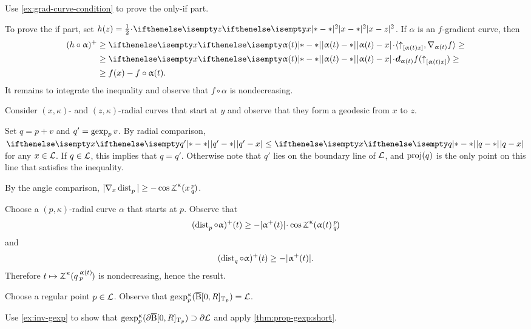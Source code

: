 Use \ref{ex:grad-curve-condition} to prove the only-if part.

To prove the if part, set $h(z)=\tfrac12\cdot\dist[2]{x}{z}{}$.
If $\alpha$ is an $f$-gradient curve, then 
\begin{align*}
(h\circ\alpha)^+&\ge \dist{\alpha(t)}{x}{}\cdot\langle\dir{\alpha(t)}{x},\nabla_{\alpha(t)}f\rangle\ge
\\
&\ge \dist{\alpha(t)}{x}{}\cdot\dd_{\alpha(t)}f(\dir{\alpha(t)}{x})\ge 
\\
&\ge f(x)-f\circ\alpha(t).
\end{align*}
It remains to integrate the inequality and observe that $f\circ\alpha$ is nondecreasing.

Consider $(x,\kappa)$- and $(z,\kappa)$-radial curves that start at $y$
and observe that they form a geodesic from $x$ to $z$.

 Set $q=p+v$ and $q'=\mathop{\rm gexp}\nolimits_pv$. 
By radial comparison, $\dist{q'}{x}{}\le \dist{q}{x}{}$ for any $x\in \spc{L}$.
If $q\in \spc{L}$, this implies that $q=q'$.
Otherwise note that $q'$ lies on the boundary line of $\mathcal{L}$, and $\mathop{\rm proj}\nolimits(q)$ is the only point on this line that satisfies the inequality.

By the angle comparison,
$|\nabla_x\distfun p|\ge-\cos \angk\kappa xpq$.

Choose a $(p,\kappa)$-radial curve $\alpha$ that starts at $p$.
Observe that 
\[(\distfun p\circ \alpha)^+(t)\ge-|\alpha^+(t)|\cdot \cos \angk\kappa {\alpha(t)}p q\]
and
\[(\distfun q\circ\alpha)^+(t)\ge -|\alpha^+(t)|.\]
Therefore $t\mapsto\angk\kappa q{\alpha(t)}p$  is nondecreasing, hence the result.

Choose a regular point $p\in\spc{L}$.
Observe that $\gexp_p^\kappa(\cBall[\0,R]_{\T_p})\z=\spc{L}$.

Use \ref{ex:inv-gexp} to show that 
$\gexp_p^\kappa(\partial\cBall[\0,R]_{\T_p})\supset\partial\spc{L}$ and apply \ref{thm:prop-gexp:short}.

